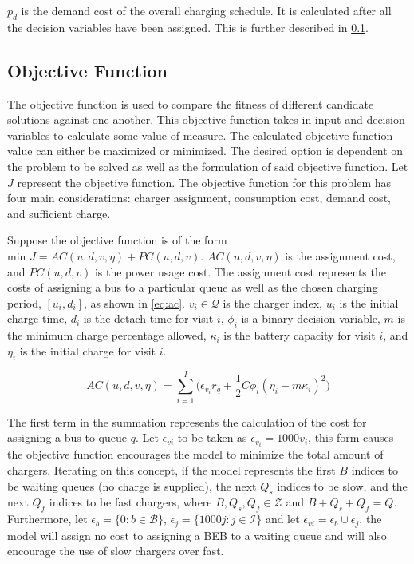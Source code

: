 \documentclass[11pt,a4paper,final]{article}
\newcommand{\AC}{AC(u, d, v, \eta)}         %
\newcommand{\PC}{PC(u, d, v)}               %
\newcommand{\Iset}{\mathcal{I}}             %
\newcommand{\Bset}{\mathcal{B}}             %
\newcommand{\Qset}{\mathcal{Q}}             %
\begin{document}
\(p_d\) is the demand cost of the overall charging schedule. It is calculated after all the decision variables have been
assigned. This is further described in \ref{sec:objective-function}.

\subsection{Objective Function}
\label{sec:objective-function}
The objective function is used to compare the fitness of different candidate solutions against one another. This
objective function takes in input and decision variables to calculate some value of measure. The calculated objective
function value can either be maximized or minimized. The desired option is dependent on the problem to be solved as well
as the formulation of said objective function. Let \(J\) represent the objective function. The objective function for this
problem has four main considerations: charger assignment, consumption cost, demand cost, and sufficient charge.

Suppose the objective function is of the form \(\text{min } J = \AC + \PC\). \(\AC\) is the assignment cost, and \(\PC\) is
the power usage cost. The assignment cost represents the costs of assigning a bus to a particular queue as well as the
chosen charging period, \([u_i, d_i]\), as shown in \ref{eq:ac}. \(v_i \in \Qset\) is the charger index, \(u_i\) is the initial charge
time, \(d_i\) is the detach time for visit \(i\), \(\phi_i\) is a binary decision variable, \(m\) is the minimum charge percentage
allowed, \(\kappa_i\) is the battery capacity for visit \(i\), and \(\eta_i\) is the initial charge for visit \(i\).

\begin{equation}
\label{eq:ac}
\AC = \sum_{i=1}^I \Big(\epsilon_{v_i}r_q + \frac{1}{2} C \phi_i (\eta_i - m \kappa_i)^{2}\Big)
\end{equation}

The first term in the summation represents the calculation of the cost for assigning a bus to queue \(q\). Let \(\epsilon_{vi}\) to
be taken as \(\epsilon_{v_i} = 1000v_i\), this form causes the objective function encourages the model to minimize the total
amount of chargers. Iterating on this concept, if the model represents the first \(B\) indices to be waiting queues (no
charge is supplied), the next \(Q_s\) indices to be slow, and the next \(Q_f\) indices to be fast chargers, where \(B, Q_s,
Q_f \in \mathcal{Z}\) and \(B + Q_s + Q_f = Q\). Furthermore, let \(\epsilon_b = \{ 0 : b \in \Bset \}\), \(\epsilon_{j} = \{ 1000 j: j \in \Iset \}\) and let
\(\epsilon_{vi} = \epsilon_b \cup \epsilon_j\), the model will assign no cost to assigning a BEB to a waiting queue and will also encourage the
use of slow chargers over fast.
\end{document}
